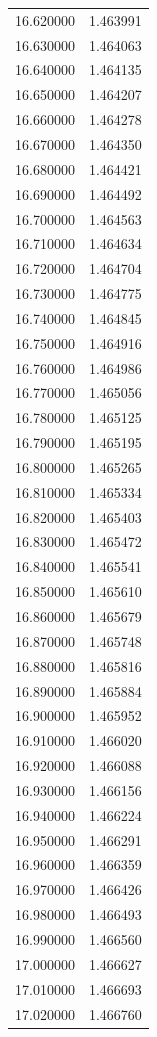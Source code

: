 \begin{tabular}{rr}
16.620000 & 1.463991 \\
16.630000 & 1.464063 \\
16.640000 & 1.464135 \\
16.650000 & 1.464207 \\
16.660000 & 1.464278 \\
16.670000 & 1.464350 \\
16.680000 & 1.464421 \\
16.690000 & 1.464492 \\
16.700000 & 1.464563 \\
16.710000 & 1.464634 \\
16.720000 & 1.464704 \\
16.730000 & 1.464775 \\
16.740000 & 1.464845 \\
16.750000 & 1.464916 \\
16.760000 & 1.464986 \\
16.770000 & 1.465056 \\
16.780000 & 1.465125 \\
16.790000 & 1.465195 \\
16.800000 & 1.465265 \\
16.810000 & 1.465334 \\
16.820000 & 1.465403 \\
16.830000 & 1.465472 \\
16.840000 & 1.465541 \\
16.850000 & 1.465610 \\
16.860000 & 1.465679 \\
16.870000 & 1.465748 \\
16.880000 & 1.465816 \\
16.890000 & 1.465884 \\
16.900000 & 1.465952 \\
16.910000 & 1.466020 \\
16.920000 & 1.466088 \\
16.930000 & 1.466156 \\
16.940000 & 1.466224 \\
16.950000 & 1.466291 \\
16.960000 & 1.466359 \\
16.970000 & 1.466426 \\
16.980000 & 1.466493 \\
16.990000 & 1.466560 \\
17.000000 & 1.466627 \\
17.010000 & 1.466693 \\
17.020000 & 1.466760 \\

\end{tabular}
